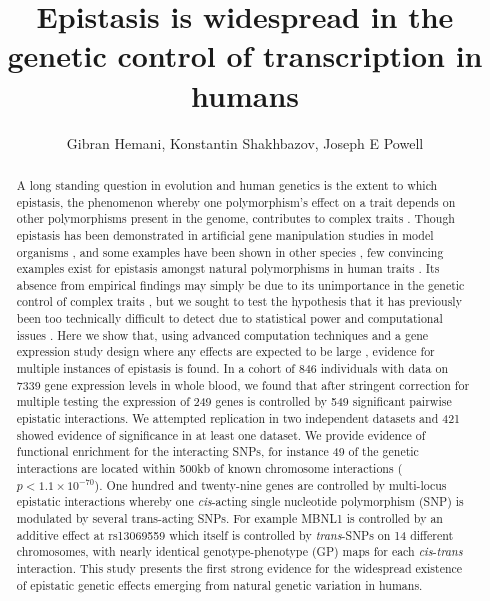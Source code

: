 \documentclass{article}
\title{Epistasis is widespread in the genetic control of transcription in humans}
\date{}
\author{Gibran Hemani, Konstantin Shakhbazov, Joseph E Powell}
\begin{document}
\maketitle


\begin{abstract}
A long standing question in evolution and human genetics is the extent to which epistasis, the phenomenon whereby one polymorphism's effect on a trait depends on other polymorphisms present in the genome, contributes to complex traits \cite{Carlborg2004, Hill2008a, Crow2010}. Though epistasis has been demonstrated in artificial gene manipulation studies in model organisms \cite{Costanzo2010, Bloom2013}, and some examples have been shown in other species \cite{Carlborg2006}, few convincing examples exist for epistasis amongst natural polymorphisms in human traits \cite{Strange2010, Evans2011}. Its absence from empirical findings may simply be due to its unimportance in the genetic control of complex traits \cite{Hill2008a, Crow2010}, but we sought to test the hypothesis that it has previously been too technically difficult to detect due to statistical power and computational issues \cite{Cordell2009}. Here we show that, using advanced computation techniques \cite{Hemani2011} and a gene expression study design where any effects are expected to be large \cite{Powell2012}, evidence for multiple instances of epistasis is found. In a cohort of 846 individuals with data on 7339 gene expression levels in whole blood, we found that after stringent correction for multiple testing the expression of 249 genes is controlled by 549 significant pairwise epistatic interactions. We attempted replication in two independent datasets \cite{Metspalu2004, Fehrmann2011} and 421 showed evidence of significance in at least one dataset. We provide evidence of functional enrichment for the interacting SNPs, for instance 49 of the genetic interactions are located within 500kb of known chromosome interactions \cite{Lan2012} ($p < 1.1 \times 10^{-70}$). One hundred and twenty-nine genes are controlled by multi-locus epistatic interactions whereby one \emph{cis}-acting single nucleotide polymorphism (SNP) is modulated by several trans-acting SNPs. For example MBNL1 is controlled by an additive effect at rs13069559 which itself is controlled by \emph{trans}-SNPs on 14 different chromosomes, with nearly identical genotype-phenotype (GP) maps for each \emph{cis}-\emph{trans} interaction. This study presents the first strong evidence for the widespread existence of epistatic genetic effects emerging from natural genetic variation in humans.
\end{abstract}
\end{document}
